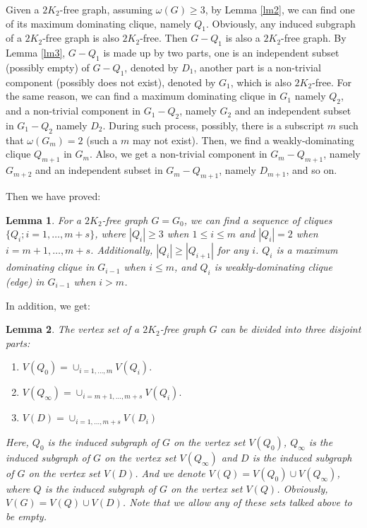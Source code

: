 \documentclass{amsart}
\newtheorem{lemma}{Lemma}
\begin{document}
Given a $2K_2$-free graph, assuming $\omega(G)\ge3$, by Lemma \ref{lm2}, we can find one of its maximum dominating clique, namely $Q_1$. Obviously, any induced subgraph of a $2K_2$-free graph is also $2K_2$-free. Then $G-Q_1$ is also a $2K_2$-free graph. By Lemma \ref{lm3}, $G-Q_1$ is made up by two parts, one is an independent subset (possibly empty) of $G-Q_1$, denoted by $D_1$, another part is a non-trivial component (possibly does not exist), denoted by $G_1$, which is also $2K_2$-free. For the same reason, we can find a maximum dominating clique in $G_1$ namely $Q_2$, and a non-trivial component in $G_1-Q_2$, namely $G_2$ and an independent subset in $G_1-Q_2$ namely $D_2$. During such process, possibly, there is a subscript $m$ such that $\omega(G_m)=2$ (such a $m$ may not exist). Then, we find a weakly-dominating clique $Q_{m+1}$ in $G_m$. Also, we get a non-trivial component in $G_m-Q_{m+1}$, namely $G_{m+2}$ and an independent subset in $G_m-Q_{m+1}$, namely $D_{m+1}$, and so on.

Then we have proved:
\begin{lemma}\label{lm5}
For a $2K_2$-free graph $G=G_0$, we can find a sequence of cliques $\{Q_i;i=1,\ldots,m+s\}$, where $|Q_i|\ge3$ when $1\le i\le m$ and $|Q_i|=2$ when $i=m+1,\ldots,m+s$. Additionally, $|Q_i|\ge|Q_{i+1}|$ for any $i$. $Q_i$ is a maximum dominating clique in $G_{i-1}$ when $i\le m$, and $Q_i$ is weakly-dominating clique (edge) in $G_{i-1}$ when $i>m$.
\end{lemma}


In addition, we get:

\begin{lemma}\label{lm6}
The vertex set of a $2K_2$-free graph $G$ can be divided into three disjoint parts:
\begin{enumerate}
\item $V(Q_0)=\cup_{i=1,\ldots,m}V(Q_i).$
\item $V(Q_{\infty})=\cup_{i=m+1,\ldots,m+s}V(Q_i).$
\item $V(D)=\cup_{i=1,\ldots,m+s}V(D_i)$
\end{enumerate}
Here, $Q_0$ is the induced subgraph of $G$ on the vertex set $V(Q_0)$, $Q_{\infty}$ is the induced subgraph of $G$ on the vertex set $V(Q_{\infty})$ and $D$ is the induced subgraph of $G$ on the vertex set $V(D)$. And we denote $V(Q)=V(Q_0)\cup V(Q_{\infty})$, where $Q$ is the induced subgraph of $G$ on the vertex set $V(Q)$. Obviously, $V(G)=V(Q)\cup V(D)$. Note that we allow any of these sets talked above to be empty.
\end{lemma}
\end{document}
